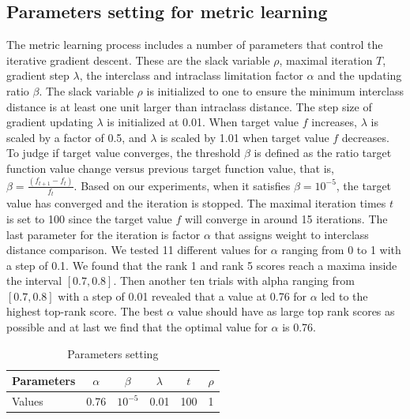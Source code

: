 \documentclass[10pt,twocolumn,letterpaper]{article}
\begin{document}
\subsection{Parameters setting for metric learning}
The metric learning process includes a number of parameters that control the iterative gradient descent. These are the slack variable $\rho$, maximal iteration $T$, gradient step $\lambda$, the interclass and intraclass limitation factor $\alpha$ and the updating ratio $\beta$. The slack variable $\rho$ is initialized to one to ensure the minimum interclass distance is at least one unit larger than intraclass distance. The step size of gradient updating $\lambda$ is initialized at 0.01. When target value $f$ increases,  $\lambda$ is scaled by a factor of 0.5, and  $\lambda$ is scaled by 1.01 when target value $f$ decreases. To judge if target value converges, the threshold $\beta$ is defined as the ratio target function value change versus previous target function value, that is, $\beta = \frac{(f_{t+1}-f_t)}{f_t}$. Based on our experiments, when it satisfies $\beta = 10^{-5}$, the target value has converged and the iteration is stopped. The maximal iteration times $t$ is set to 100 since the target value $f$ will converge in around 15 iterations.  The last parameter for the iteration is factor $\alpha$ that assigns weight to interclass distance comparison. We tested 11 different values for $\alpha$ ranging from 0 to 1 with a step of 0.1. We found that the rank 1 and rank 5 scores reach a maxima inside the interval $[0.7,0.8]$. Then another ten trials with alpha ranging from $[0.7,0.8]$ with a step of 0.01 revealed that a value at 0.76 for $\alpha$ led to the highest top-rank score. The best $\alpha$ value should have as large top rank scores as possible and at last we find that the optimal value for $\alpha$ is 0.76.
\begin{table}[H]
\centering
\caption{Parameters setting}
\begin{tabular}{|l|c|c|c|c|c|}
\hline
Parameters &$\alpha$& $\beta$& $\lambda$&$t$& $\rho$\\
\hline
Values &0.76&$10^{-5}$&0.01&100&1\\
\hline
\end{tabular}
\end{table}

\end{document}
